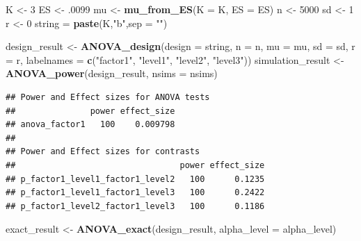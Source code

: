 \documentclass[]{book}
\newenvironment{Shaded}{\begin{snugshade}}{\end{snugshade}}
\newcommand{\DataTypeTok}[1]{\textcolor[rgb]{0.13,0.29,0.53}{#1}}
\newcommand{\DecValTok}[1]{\textcolor[rgb]{0.00,0.00,0.81}{#1}}
\newcommand{\FloatTok}[1]{\textcolor[rgb]{0.00,0.00,0.81}{#1}}
\newcommand{\KeywordTok}[1]{\textcolor[rgb]{0.13,0.29,0.53}{\textbf{#1}}}
\newcommand{\NormalTok}[1]{#1}
\newcommand{\StringTok}[1]{\textcolor[rgb]{0.31,0.60,0.02}{#1}}
\begin{document}
\begin{Shaded}
\begin{Highlighting}[]
\NormalTok{K <-}\StringTok{ }\DecValTok{3}
\NormalTok{ES <-}\StringTok{ }\FloatTok{.0099}
\NormalTok{mu <-}\StringTok{ }\KeywordTok{mu_from_ES}\NormalTok{(}\DataTypeTok{K =}\NormalTok{ K, }\DataTypeTok{ES =}\NormalTok{ ES)}
\NormalTok{n <-}\StringTok{ }\DecValTok{5000}
\NormalTok{sd <-}\StringTok{ }\DecValTok{1}
\NormalTok{r <-}\StringTok{ }\DecValTok{0}
\NormalTok{string =}\StringTok{ }\KeywordTok{paste}\NormalTok{(K,}\StringTok{"b"}\NormalTok{,}\DataTypeTok{sep =} \StringTok{""}\NormalTok{)}
\end{Highlighting}
\end{Shaded}

\begin{Shaded}
\begin{Highlighting}[]
\NormalTok{design_result <-}\StringTok{ }\KeywordTok{ANOVA_design}\NormalTok{(}\DataTypeTok{design =}\NormalTok{ string,}
                   \DataTypeTok{n =}\NormalTok{ n, }
                   \DataTypeTok{mu =}\NormalTok{ mu, }
                   \DataTypeTok{sd =}\NormalTok{ sd, }
                   \DataTypeTok{r =}\NormalTok{ r, }
                   \DataTypeTok{labelnames =} \KeywordTok{c}\NormalTok{(}\StringTok{"factor1"}\NormalTok{, }\StringTok{"level1"}\NormalTok{, }\StringTok{"level2"}\NormalTok{, }\StringTok{"level3"}\NormalTok{))}
\NormalTok{simulation_result <-}\StringTok{ }\KeywordTok{ANOVA_power}\NormalTok{(design_result, }\DataTypeTok{nsims =}\NormalTok{ nsims)}
\end{Highlighting}
\end{Shaded}

\begin{verbatim}
## Power and Effect sizes for ANOVA tests
##               power effect_size
## anova_factor1   100    0.009798
## 
## Power and Effect sizes for contrasts
##                                 power effect_size
## p_factor1_level1_factor1_level2   100      0.1235
## p_factor1_level1_factor1_level3   100      0.2422
## p_factor1_level2_factor1_level3   100      0.1186
\end{verbatim}

\begin{Shaded}
\begin{Highlighting}[]
\NormalTok{exact_result <-}\StringTok{ }\KeywordTok{ANOVA_exact}\NormalTok{(design_result, }\DataTypeTok{alpha_level =}\NormalTok{ alpha_level)}
\end{Highlighting}
\end{Shaded}
\end{document}
